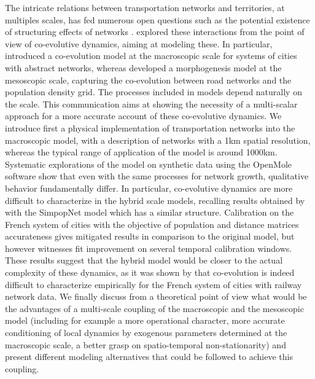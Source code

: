The intricate relations between transportation networks and territories, at multiples scales, has fed numerous open questions such as the potential existence of structuring effects of networks \cite{offner1993effets}. \cite{raimbault2018caracterisation} explored these interactions from the point of view of co-evolutive dynamics, aiming at modeling these. In particular, \cite{raimbault2018modeling} introduced a co-evolution model at the macroscopic scale for systems of cities with abstract networks, whereas \cite{raimbault2018urban} developed a morphogenesis model at the mesoscopic scale, capturing the co-evolution between road networks and the population density grid. The processes included in models depend naturally on the scale. This communication aims at showing the necessity of a multi-scalar approach for a more accurate account of these co-evolutive dynamics. We introduce first a physical implementation of transportation networks into the macroscopic model, with a description of networks with a 1km spatial resolution, whereas the typical range of application of the model is around 1000km. Systematic explorations of the model on synthetic data using the OpenMole software show that even with the same processes for network growth, qualitative behavior fundamentally differ. In particular, co-evolutive dynamics are more difficult to characterize in the hybrid scale models, recalling results obtained by \cite{raimbault2018caracterisation} with the SimpopNet model \cite{schmitt2014modelisation} which has a similar structure. Calibration on the French system of cities with the objective of population and distance matrices accurateness gives mitigated results in comparison to the original model, but however witnesses fit improvement on several temporal calibration windows. These results suggest that the hybrid model would be closer to the actual complexity of these dynamics, as it was shown by \cite{raimbault2018modeling} that co-evolution is indeed difficult to characterize empirically for the French system of cities with railway network data. We finally discuss from a theoretical point of view what would be the advantages of a multi-scale coupling of the macroscopic and the mesoscopic model (including for example a more operational character, more accurate conditioning of local dynamics by exogenous parameters determined at the macroscopic scale, a better grasp on spatio-temporal non-stationarity) and present different modeling alternatives that could be followed to achieve this coupling.






\footnotesize






